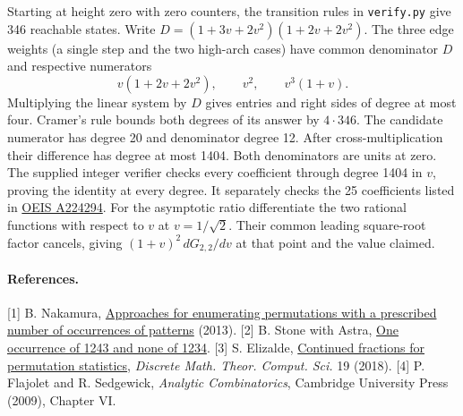 \documentclass[11pt,letterpaper]{article}
\begin{document}
Starting at height zero with zero counters, the transition rules in \texttt{verify.py} give 346 reachable states. Write $D=(1+3v+2v^2)(1+2v+2v^2)$. The three edge weights (a single step and the two high-arch cases) have common denominator $D$ and respective numerators
\[
 v(1+2v+2v^2),\qquad v^2,\qquad v^3(1+v).
\]
Multiplying the linear system by $D$ gives entries and right sides of degree at most four. Cramer's rule bounds both degrees of its answer by $4\cdot346$. The candidate numerator has degree 20 and denominator degree 12. After cross-multiplication their difference has degree at most 1404. Both denominators are units at zero. The supplied integer verifier checks every coefficient through degree 1404 in $v$, proving the identity at every degree. It separately checks the 25 coefficients listed in \href{https://oeis.org/A224294}{OEIS A224294}. For the asymptotic ratio differentiate the two rational functions with respect to $v$ at $v=1/\sqrt2$. Their common leading square-root factor cancels, giving $(1+v)^2\,dG_{2,2}/dv$ at that point and the value claimed.

\paragraph{References.}
[1] B. Nakamura, \href{https://arxiv.org/abs/1301.5080}{Approaches for enumerating permutations with a prescribed number of occurrences of patterns} (2013).
[2] B. Stone with Astra, \href{https://github.com/blakestone-x/math/blob/d8555a3a1d36da63c29db7d17beb09729cc74252/A224292/one-pattern.pdf}{One occurrence of 1243 and none of 1234}.
[3] S. Elizalde, \href{https://dmtcs.episciences.org/4602}{Continued fractions for permutation statistics}, \emph{Discrete Math. Theor. Comput. Sci.} 19 (2018).
[4] P. Flajolet and R. Sedgewick, \emph{Analytic Combinatorics}, Cambridge University Press (2009), Chapter VI.
\end{document}
